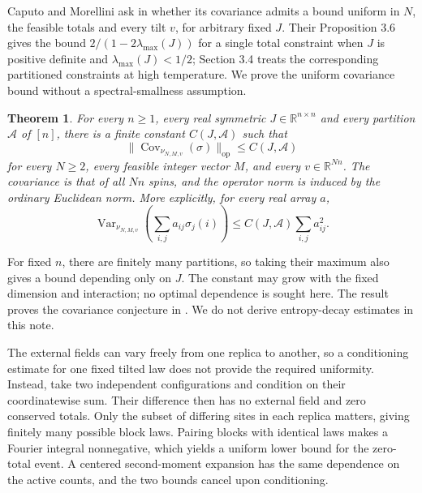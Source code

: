 \documentclass[11pt]{article}
\newtheorem{theorem}{Theorem}[section]
\begin{document}
Caputo and Morellini ask in \cite[Section 4.5]{CM} whether its covariance
admits a bound uniform in $N$, the feasible totals and every tilt $v$, for
arbitrary fixed $J$. Their Proposition 3.6 gives the bound
$2/(1-2\lambda_{\max}(J))$ for a single total constraint when $J$ is positive
definite and $\lambda_{\max}(J)<1/2$; Section 3.4 treats the corresponding
partitioned constraints at high temperature. We prove the uniform covariance
bound without a spectral-smallness assumption.

\begin{theorem}\label{thm:main}
For every $n\geq1$, every real symmetric $J\in\mathbb R^{n\times n}$ and every
partition $\mathcal A$ of $[n]$, there is a finite constant
$C(J,\mathcal A)$ such that
\begin{equation}\label{eq:main}
 \bigl\|\operatorname{Cov}_{\nu_{N,M,v}}(\sigma)\bigr\|_{\mathrm{op}}
 \leq C(J,\mathcal A)
\end{equation}
for every $N\geq2$, every feasible integer vector $M$, and every
$v\in\mathbb R^{Nn}$. The covariance is that of all $Nn$ spins, and the
operator norm is induced by the ordinary Euclidean norm. More explicitly,
for every real array $a$,
\begin{equation}\label{eq:variance}
 \operatorname{Var}_{\nu_{N,M,v}}\left(\sum_{i,j}a_{ij}\sigma_j(i)\right)
 \leq C(J,\mathcal A)\sum_{i,j}a_{ij}^2.
\end{equation}
\end{theorem}
For fixed $n$, there are finitely many partitions, so taking their maximum
also gives a bound depending only on $J$. The constant may grow with the fixed
dimension and interaction; no optimal dependence is sought here. The result proves the covariance conjecture in
\cite[Section 4.5]{CM}. We do not derive entropy-decay estimates in this note.

The external fields can vary freely from one replica to another, so a
conditioning estimate for one fixed tilted law does not provide the required
uniformity. Instead, take two independent configurations and condition on
their coordinatewise sum. Their difference then has no external field and
zero conserved totals. Only the subset of differing sites in each replica
matters, giving finitely many possible block laws. Pairing blocks with
identical laws makes a Fourier integral nonnegative, which yields a uniform
lower bound for the zero-total event. A centered second-moment expansion
has the same dependence on the active counts, and the two bounds cancel
upon conditioning.
\end{document}
